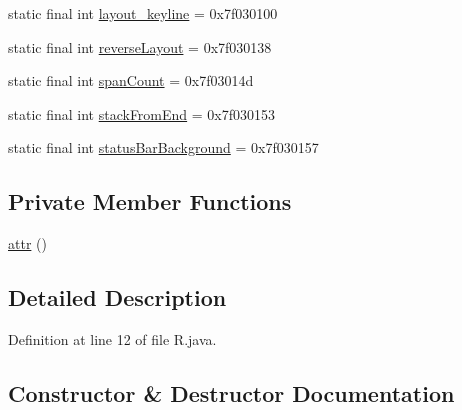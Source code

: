 \begin{DoxyCompactItemize}
\item 
static final int \mbox{\hyperlink{classandroid_1_1support_1_1v7_1_1recyclerview_1_1_r_1_1attr_a5137b7faf6a7de74a1f258a5fb19fe40}{layout\+\_\+keyline}} = 0x7f030100
\item 
static final int \mbox{\hyperlink{classandroid_1_1support_1_1v7_1_1recyclerview_1_1_r_1_1attr_a3260f6f39d728308f292d24f97e646d3}{reverse\+Layout}} = 0x7f030138
\item 
static final int \mbox{\hyperlink{classandroid_1_1support_1_1v7_1_1recyclerview_1_1_r_1_1attr_a921f3d6f2a6673a0ea63b48e0fddf7d3}{span\+Count}} = 0x7f03014d
\item 
static final int \mbox{\hyperlink{classandroid_1_1support_1_1v7_1_1recyclerview_1_1_r_1_1attr_ad048157c30076371166ead7bb83de5f3}{stack\+From\+End}} = 0x7f030153
\item 
static final int \mbox{\hyperlink{classandroid_1_1support_1_1v7_1_1recyclerview_1_1_r_1_1attr_aa5139957d7634ac7127856d8307007af}{status\+Bar\+Background}} = 0x7f030157
\end{DoxyCompactItemize}
\subsection*{Private Member Functions}
\begin{DoxyCompactItemize}
\item 
\mbox{\hyperlink{classandroid_1_1support_1_1v7_1_1recyclerview_1_1_r_1_1attr_adc408091d2845f4b04aecf4cb72b70bf}{attr}} ()
\end{DoxyCompactItemize}


\subsection{Detailed Description}


Definition at line 12 of file R.\+java.



\subsection{Constructor \& Destructor Documentation}
\mbox{\label{classandroid_1_1support_1_1v7_1_1recyclerview_1_1_r_1_1attr_adc408091d2845f4b04aecf4cb72b70bf}} 
